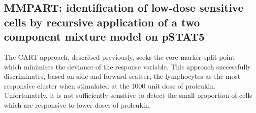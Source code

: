 

%



\subsection{MMPART: identification of low-dose sensitive cells by recursive application of a two component mixture model on pSTAT5}

The CART approach, described previously, seeks the core marker split point which minimises the deviance of the response variable.
This approach successfully discriminates, based on side and forward scatter, the lymphocytes as the most responsive cluster
when stimulated at the 1000 unit dose of proleukin.
Unfortunately, it is not sufficiently sensitive to detect the small proportion of cells which are responsive to lower doses of proleukin.

